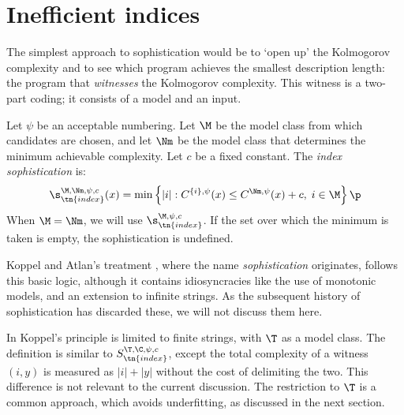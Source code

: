 \section{Inefficient indices}
\label{section:indices}

The simplest approach to sophistication would be to `open up' the Kolmogorov complexity and to see which program achieves the smallest description length: the program that \emph{witnesses} the Kolmogorov complexity. This witness is a two-part coding; it consists of a model and an input.

\begin{definition}
Let $\psi$ be an acceptable numbering. Let $\M$ be the model class from which candidates are chosen, and let $\Nm$ be the model class that determines the minimum achievable complexity. Let $c$ be a fixed constant. The \emph{index sophistication} is:
\[
\s_{\tn{index}}^{\M,\Nm,\psi,c}(x) = \min\left\{ |i| : C^{\{i\}, \psi}(x) \leq C^{\Nm, \psi}(x)+c,\;i \in \M\right\} \p
\]
When $\M = \Nm$, we will use $\s_\tn{index}^{\M,\psi,c}$. If the set over which the minimum is taken is empty, the sophistication is undefined.\label{definition:index}
\end{definition}
Koppel and Atlan's treatment \cite{koppelSoph1988,koppel1991almost}, where the name \emph{sophistication} originates, follows this basic logic, although it contains idiosyncracies like the use of monotonic models, and an extension to infinite strings. As the subsequent history of sophistication has discarded these, we will not discuss them here.

In \cite{antunes2009sophistication,antunes2013sophistication} Koppel's principle is limited to finite strings, with $\T$ as a model class. The definition is similar to $S_\tn{index}^{\T, \C,\psi,c}$, except the total complexity of a witness $(i,y)$ is measured as $|i|+|y|$ without the cost of delimiting the two. This difference is not relevant to the current discussion. The restriction to $\T$ is a common approach, which avoids underfitting, as discussed in the next section. 

